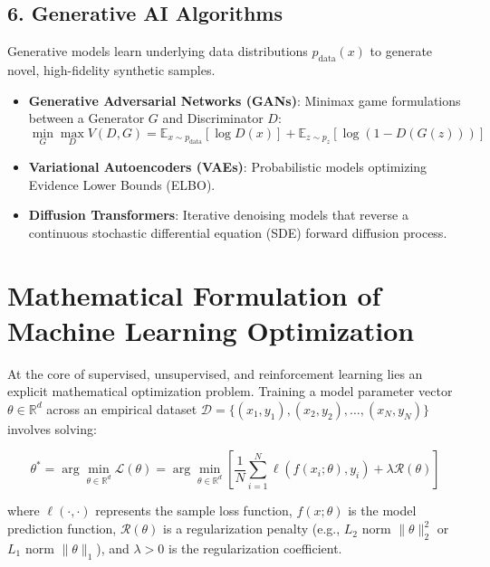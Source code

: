 \subsection{6. Generative AI Algorithms}
Generative models learn underlying data distributions $p_{\text{data}}(x)$ to generate novel, high-fidelity synthetic samples.
\begin{itemize}[leftmargin=*]
    \item \textbf{Generative Adversarial Networks (GANs)}: Minimax game formulations between a Generator $G$ and Discriminator $D$:
    \begin{equation}
    \min_G \max_D V(D, G) = \mathbb{E}_{x \sim p_{\text{data}}} [\log D(x)] + \mathbb{E}_{z \sim p_z} [\log(1 - D(G(z)))]
    \end{equation}
    \item \textbf{Variational Autoencoders (VAEs)}: Probabilistic models optimizing Evidence Lower Bounds (ELBO).
    \item \textbf{Diffusion Transformers}: Iterative denoising models that reverse a continuous stochastic differential equation (SDE) forward diffusion process.

\end{itemize}

\section{Mathematical Formulation of Machine Learning Optimization}
At the core of supervised, unsupervised, and reinforcement learning lies an explicit mathematical optimization problem. Training a model parameter vector $\theta \in \mathbb{R}^d$ across an empirical dataset $\mathcal{D} = \{(x_1, y_1), (x_2, y_2), \dots, (x_N, y_N)\}$ involves solving:

\begin{equation}
\theta^* = \arg\min_{\theta \in \mathbb{R}^d} \mathcal{L}(\theta) = \arg\min_{\theta \in \mathbb{R}^d} \left[ \frac{1}{N} \sum_{i=1}^N \ell(f(x_i; \theta), y_i) + \lambda \mathcal{R}(\theta) \right]
\end{equation}

where $\ell(\cdot, \cdot)$ represents the sample loss function, $f(x; \theta)$ is the model prediction function, $\mathcal{R}(\theta)$ is a regularization penalty (e.g., $L_2$ norm $\|\theta\|_2^2$ or $L_1$ norm $\|\theta\|_1$), and $\lambda > 0$ is the regularization coefficient.

